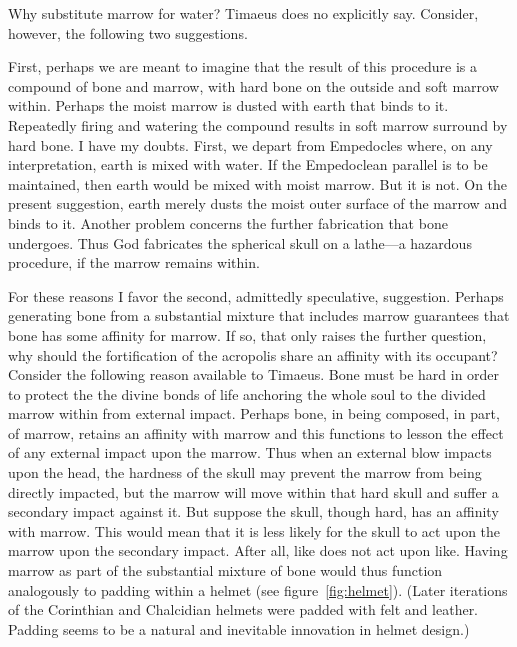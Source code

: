 Why substitute marrow for water? Timaeus does no explicitly say. Consider, however, the following two suggestions.

First, perhaps we are meant to imagine that the result of this procedure is a compound of bone and marrow, with hard bone on the outside and soft marrow within. Perhaps the moist marrow is dusted with earth that binds to it. Repeatedly firing and watering the compound results in soft marrow surround by hard bone. I have my doubts. First, we depart from Empedocles where, on any interpretation, earth is mixed with water. If the Empedoclean parallel is to be maintained, then earth would be mixed with moist marrow. But it is not. On the present suggestion, earth merely dusts the moist outer surface of the marrow and binds to it. Another problem concerns the further fabrication that bone undergoes. Thus God fabricates the spherical skull on a lathe---a hazardous procedure, if the marrow remains within.

For these reasons I favor the second, admittedly speculative, suggestion. Perhaps generating bone from a substantial mixture that includes marrow guarantees that bone has some affinity for marrow. If so, that only raises the further question, why should the fortification of the acropolis share an affinity with its occupant? Consider the following reason available to Timaeus. Bone must be hard in order to protect the the divine bonds of life anchoring the whole soul to the divided marrow within from external impact. Perhaps bone, in being composed, in part, of marrow, retains an affinity with marrow and this functions to lesson the effect of any external impact upon the marrow. Thus when an external blow impacts upon the head, the hardness of the skull may prevent the marrow from being directly impacted, but the marrow will move within that hard skull and suffer a secondary impact against it. But suppose the skull, though hard, has an affinity with marrow. This would mean that it is less likely for the skull to act upon the marrow upon the secondary impact. After all, like does not act upon like. Having marrow as part of the substantial mixture of bone would thus function analogously to padding within a helmet (see figure~\ref{fig:helmet}). (Later iterations of the Corinthian and Chalcidian helmets were padded with felt and leather. Padding seems to be a natural and inevitable innovation in helmet design.)

